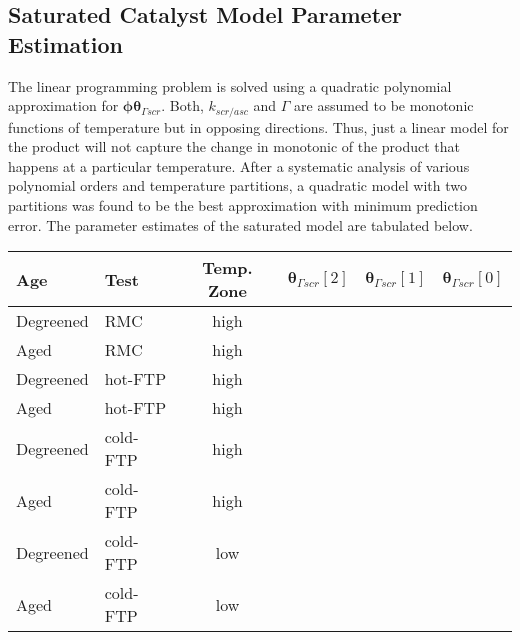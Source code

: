 \subsection{Saturated Catalyst Model Parameter Estimation}

The linear programming problem is solved using a quadratic polynomial approximation for $\pmb \phi \pmb \theta_{\Gamma scr}$. Both, $k_{scr/asc}$ and $\Gamma$ are assumed to be monotonic functions of temperature but in opposing directions. Thus, just a linear model for the product will not capture the change in monotonic of the product that happens at a particular temperature. After a systematic analysis of various polynomial orders and temperature partitions, a quadratic model with two partitions was found to be the best approximation with minimum prediction error. The parameter estimates of the saturated model are tabulated below.

\begin{table}[H]
        \centering
        \begin{tabular}{l l c c c c}
                \hline \hline
                Age & Test & Temp. Zone &
                $\pmb \theta_{\Gamma scr}[2]$ &
                $\pmb \theta_{\Gamma scr}[1]$ &
                $\pmb \theta_{\Gamma scr}[0]$ \\ \hline \hline
                Degreened & RMC & high & & & \\
                Aged & RMC & high & & & \\
                Degreened & hot-FTP & high & & & \\
                Aged & hot-FTP & high & & & \\
                Degreened & cold-FTP & high & & & \\
                Aged & cold-FTP & high & & & \\
                Degreened & cold-FTP & low & & & \\
                Aged & cold-FTP & low & & & \\
                \hline \hline
        \end{tabular}
\end{table}
